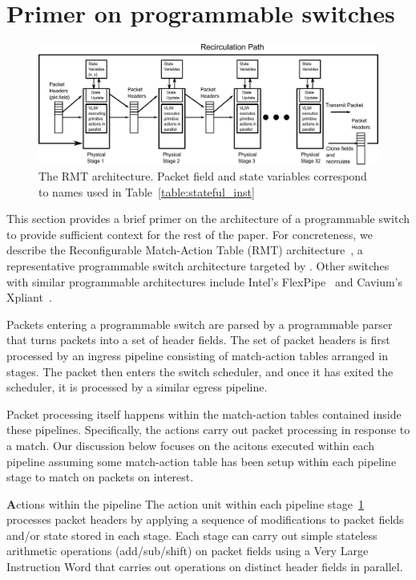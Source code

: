 \section{Primer on programmable switches}
\label{s:architecture}

\begin{figure}[t]
\includegraphics[width=\textwidth]{p4_switch_model.pdf}
\caption{The RMT architecture. Packet field and state variables correspond to
names used in Table~\ref{table:stateful_inst}}
\label{fig:architecture}
\end{figure}

This section provides a brief primer on the architecture of a programmable
switch to provide sufficient context for the rest of the paper. For
concreteness, we describe the Reconfigurable Match-Action Table (RMT)
architecture~\cite{rmt}, a representative programmable switch architecture
targeted by \pktlanguage{}. Other switches with similar programmable
architectures include Intel's FlexPipe~\cite{flexpipe} and Cavium's
Xpliant~\cite{xpliant}.

Packets entering a programmable switch are parsed by a programmable parser that
turns packets into a set of header fields. The set of packet headers is first
processed by an ingress pipeline consisting of match-action tables arranged in
stages. The packet then enters the switch scheduler, and once it has exited the
scheduler, it is processed by a similar egress pipeline.

Packet processing itself happens within the match-action tables contained
inside these pipelines. Specifically, the actions carry out packet processing
in response to a match. Our discussion below focuses on the acitons executed
within each pipeline assuming some match-action table has been setup within
each pipeline stage to match on packets on interest.

{\textbf Actions within the pipeline}
The action unit within each pipeline stage~\ref{fig:architecture} processes
packet headers by applying a sequence of modifications to packet fields and/or
state stored in each stage. Each stage can carry out simple stateless
arithmetic operations (add/sub/shift) on packet fields using a Very Large
Instruction Word that carries out operations on distinct header fields in
parallel.

